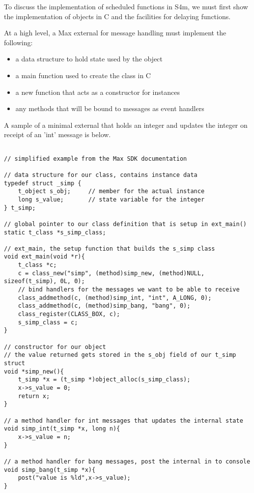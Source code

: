\documentclass[acmsmall]{acmart}
\begin{document}
{To discuss the implementation of scheduled functions in S4m, we must first show
the implementation of objects in C and the facilities for delaying functions.

At a high level, a Max external for message handling must implement the following:
\begin{itemize}
\item a data structure to hold state used by the object
\item a main function used to create the class in C
\item a new function that acts as a constructor for instances
\item any methods that will be bound to messages as event handlers
\end{itemize}

A sample of a minimal external that holds an integer and updates the integer
on receipt of an 'int' message is below.

\begin{verbatim}

// simplified example from the Max SDK documentation

// data structure for our class, contains instance data
typedef struct _simp {
    t_object s_obj;     // member for the actual instance 
    long s_value;       // state variable for the integer
} t_simp;

// global pointer to our class definition that is setup in ext_main()
static t_class *s_simp_class; 

// ext_main, the setup function that builds the s_simp class
void ext_main(void *r){
    t_class *c;
    c = class_new("simp", (method)simp_new, (method)NULL, sizeof(t_simp), 0L, 0);
    // bind handlers for the messages we want to be able to receive
    class_addmethod(c, (method)simp_int, "int", A_LONG, 0);
    class_addmethod(c, (method)simp_bang, "bang", 0);
    class_register(CLASS_BOX, c);
    s_simp_class = c;
}

// constructor for our object
// the value returned gets stored in the s_obj field of our t_simp struct
void *simp_new(){
    t_simp *x = (t_simp *)object_alloc(s_simp_class);
    x->s_value = 0;
    return x;
}

// a method handler for int messages that updates the internal state
void simp_int(t_simp *x, long n){
    x->s_value = n;
}

// a method handler for bang messages, post the internal in to console
void simp_bang(t_simp *x){
    post("value is %ld",x->s_value);
}


\end{verbatim}}
\end{document}

